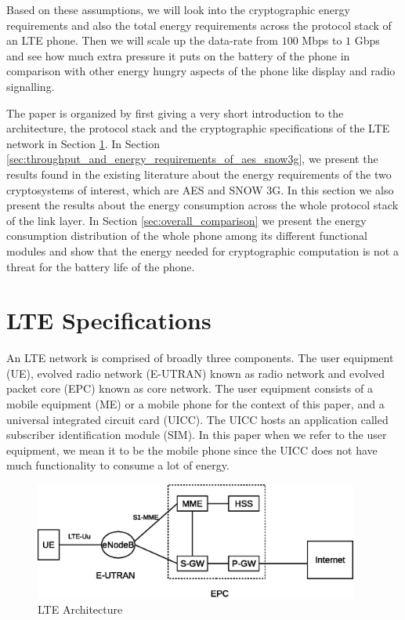 \documentclass[12pt]{llncs}
\begin{document}
Based on these assumptions, we will look into the cryptographic energy requirements and also the total energy requirements across the protocol stack of an LTE phone. Then we will scale up the data-rate from $100$ Mbps to $1$ Gbps and see how much extra pressure it puts on the battery of the phone in comparison with other energy hungry aspects of the phone like display and radio signalling.

The paper is organized by first giving a very short introduction to the architecture, the protocol stack and the cryptographic specifications of the LTE network in Section \ref{sec:lte_specifications}. In Section \ref{sec:throughput_and_energy_requirements_of_aes_snow3g}, we present the results found in the existing literature about the energy requirements of the two cryptosystems of interest, which are AES and SNOW 3G. In this section we also present the results about the energy consumption across the whole protocol stack of the link layer. In Section \ref{sec:overall_comparison} we present the energy consumption distribution of the whole phone among its different functional modules and show that the energy needed for cryptographic computation is not a threat for the battery life of the phone. 

\section{LTE Specifications}
\label{sec:lte_specifications}
An LTE network is comprised of broadly three components. The user equipment (UE), evolved radio network (E-UTRAN) known as radio network and evolved packet core (EPC) known as core network. The user equipment consists of a mobile equipment (ME) or a mobile phone for the context of this paper, and a universal integrated circuit card (UICC). The UICC hosts an application called subscriber identification module (SIM). In this paper when we refer to the user equipment, we mean it to be the mobile phone since the UICC does not have much functionality to consume a lot of energy.

\begin{figure}
\begin{center}
  \includegraphics[width=0.95\textwidth]{lte_architecture.eps}
\caption{LTE Architecture}
\label{fig:protocl_stack}       %
\end{center}
\end{figure}
\end{document}
